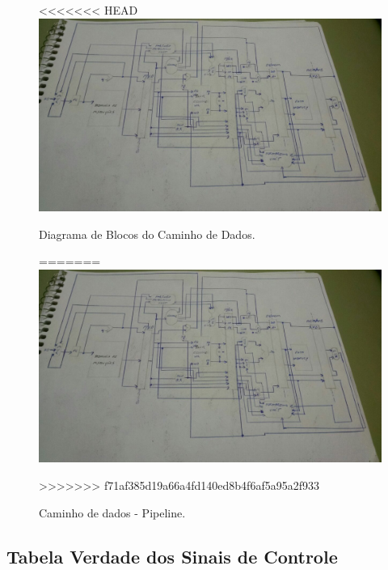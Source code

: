 \documentclass[12pt]{article}
\begin{document}
\begin{figure}[H]
	\flushleft
<<<<<<< HEAD
	\includegraphics[width=1\textwidth]{caminho_de_dados.jpg}
	\caption{Diagrama de Blocos do Caminho de Dados.}
=======
	\includegraphics[width=1\textwidth]{pipe.jpg}
	\caption{Caminho de dados - Pipeline.}
>>>>>>> f71af385d19a66a4fd140ed8b4f6af5a95a2f933
	\label{fig:pfunct}
\end{figure}

\subsection{Tabela Verdade dos Sinais de Controle}
\end{document}
